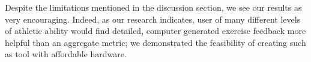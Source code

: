 Despite the limitations mentioned in the discussion section, we see our results as very encouraging. Indeed, as our research indicates, user of many different levels of athletic ability would find detailed, computer generated exercise feedback more helpful than an aggregate metric; we demonstrated the feasibility of creating such as tool with affordable hardware.
